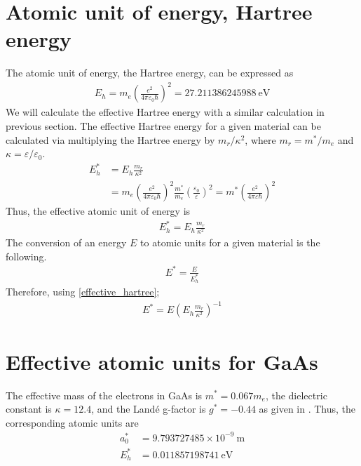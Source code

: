 \documentclass[a4paper,12pt]{report}
\begin{document}
\section*{Atomic unit of energy, Hartree energy} \label{hartree}
The atomic unit of energy, the Hartree energy, can be expressed as
\begin{align}
    E_{h} = m_{e} \left( \frac{e^{2}}{4 \pi \varepsilon_{0} \hbar} \right)^{2}
          = 27.211386245988 \ \textrm{eV}
\end{align}
We will calculate the effective Hartree energy with a similar calculation in
previous section. The effective Hartree energy for a given material
can be calculated via multiplying the Hartree energy by $m_{r}/\kappa^{2}$,
where $m_{r} = m^{*}/m_{e}$ and $\kappa = \varepsilon/\varepsilon_{0}$.
\begin{align}
    E^{*}_{h} &= E_{h} \frac{m_{r}}{\kappa^{2}} \nonumber \\
              &= m_{e} \left( \frac{e^{2}}{4 \pi \varepsilon_{0} \hbar} \right)^{2}
              \frac{m^{*}}{m_{e}} \left(\frac{\varepsilon_{0}}{\varepsilon}\right)^{2}
              = m^{*} \left( \frac{e^{2}}{4 \pi \varepsilon \hbar} \right)^{2}
\end{align}
Thus, the effective atomic unit of energy is
\begin{align} \label{effective_hartree}
    \boxed{ E^{*}_{h} = E_{h} \frac{m_{r}}{\kappa^{2}} }
\end{align}
The conversion of an energy $E$ to atomic units for a given material is
the following.
\begin{align}
    \boxed{ E^{*} = \frac{E}{E^{*}_{h}} }
\end{align} 
Therefore, using \ref{effective_hartree};
\begin{align}
    \boxed{ E^{*} = E \left( E_{h} \frac{m_{r}}{\kappa^{2}} \right)^{-1} }
\end{align} 

\section*{Effective atomic units for GaAs}
The effective mass of the electrons in GaAs is $m^{*}=0.067m_{e}$, the
dielectric constant is $\kappa=12.4$, and the Landé g-factor is $g^{*} = -0.44$
as given in \cite{devrimguclu_1}. Thus, the corresponding atomic units are
\begin{align}
a^{*}_{0} &= 9.793727485 \times 10^{-9} \ \textrm{m} \nonumber \\
E^{*}_{h} &= 0.011857198741 \ \textrm{eV} \nonumber
\end{align}



\end{document}
